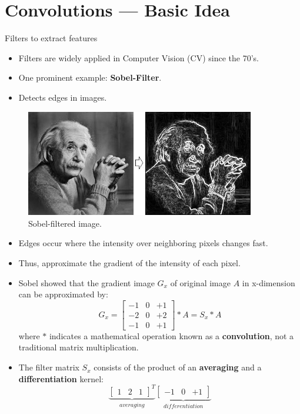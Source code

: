 \section{Convolutions --- Basic Idea}

\begin{vbframe}{Filters to extract features}
    \begin{itemize}
        \item Filters are widely applied in Computer Vision (CV) since the 70's.
        \item One prominent example: \textbf{Sobel-Filter}.
        \item Detects edges in images.
    \end{itemize}
    \begin{figure}
        \centering
        \includegraphics[width=10cm]{plots/02_filters/sobel_einstein.png}
        \caption{Sobel-filtered image.}
    \end{figure}
\framebreak
    \begin{itemize}
        \item Edges occur where the intensity over neighboring pixels changes fast.
        \item Thus, approximate the gradient of the intensity of each pixel.
        \item Sobel showed that the gradient image $G_x$ of original image $A$ in x-dimension  can be approximated by:
        $$
            G_x = 
            \begin{bmatrix}
                -1 & 0 & +1 \\
                -2 & 0 & +2 \\
                -1 & 0 & +1 
            \end{bmatrix} * A = S_x * A
        $$
        where $*$ indicates a mathematical operation known as a \textbf{convolution}, not a traditional matrix multiplication.
        \item The filter matrix $S_x$ consists of the product of an \textbf{averaging} and a \textbf{differentiation} kernel: 
        $$
            \underbrace{\begin{bmatrix}
                1 & 2 & 1   
            \end{bmatrix}^{T}}_{averaging}
            \underbrace{\begin{bmatrix}
                -1 & 0 & +1   
            \end{bmatrix}}_{differentiation}
        $$
        

\end{itemize}
\end{vbframe}
